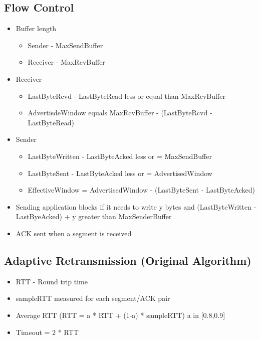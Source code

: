 \documentclass[../resumosRCOM.tex]{subfiles}
\begin{document}
\subsection{Flow Control}
\begin{itemize}
    \item Buffer length
    \begin{itemize}
        \item Sender - MaxSendBuffer
        \item Receiver - MaxRcvBuffer
    \end{itemize}
    \item Receiver
    \begin{itemize}
        \item LastByteRcvd - LastByteRead less or equal than MaxRcvBuffer
        \item AdvertisdeWindow equals MaxRcvBuffer - (LastByteRcvd - LastByteRead) 
    \end{itemize}
    \item Sender
    \begin{itemize}
        \item LastByteWritten - LastByteAcked less or = MaxSendBuffer
        \item LastByteSent - LastByteAcked less or = AdvertisedWindow
        \item EffectiveWindow = AdvertisedWindow - (LastByteSent - LastByteAcked)
    \end{itemize}
    \item Sending application blocks if it needs to write y bytes and (LastByteWritten - LastByeAcked) + y greater than MaxSenderBuffer
    \item ACK sent when a segment is received
\end{itemize}

\subsection{Adaptive Retransmission (Original Algorithm)}
\begin{itemize}
    \item RTT - Round trip time
    \item sampleRTT measured for each segment/ACK pair
    \item Average RTT (RTT = a * RTT + (1-a) * sampleRTT) a in [0.8,0.9]
    \item Timeout = 2 * RTT
\end{itemize}
\end{document}
